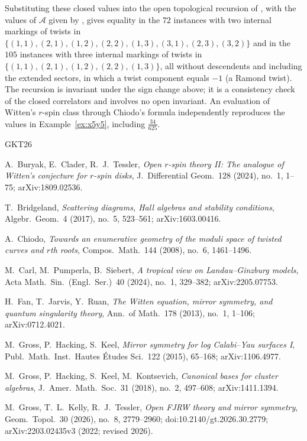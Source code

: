 \documentclass[11pt]{amsart}
\theoremstyle{definition}
\theoremstyle{remark}
\newcommand{\Ascr}{\mathcal{A}}
\begin{document}
Substituting these closed values into the open topological
recursion of \cite[Thm.~0.5]{GKT}, with the values of $\Ascr$ given by
\cite[Cor.~5.11]{GKT}, gives equality in the $72$ instances with two internal
markings of twists in $\{(1,1),(2,1),(1,2),(2,2),(1,3),(3,1),(2,3),(3,2)\}$
and in the $105$ instances with three internal markings of twists in
$\{(1,1),(2,1),(1,2),(2,2),(1,3)\}$, all without descendents and including the
extended sectors, in which a twist component equals $-1$ (a Ramond twist).  The recursion is invariant under
the sign change above; it is a consistency check of the closed correlators and
involves no open invariant.  An evaluation of Witten's $r$-spin class through
Chiodo's formula \cite{Chiodo08} independently reproduces the values in
Example~\ref{ex:x5y5}, including $\tfrac{34}{625}$.

\begin{thebibliography}{GKT26}

 A.~Buryak, E.~Clader, R.~J.~Tessler,
\emph{Open $r$-spin theory II: The analogue of Witten's conjecture for
$r$-spin disks}, J.\ Differential Geom.\ 128 (2024), no.~1, 1--75;
arXiv:1809.02536.

 T.~Bridgeland,
\emph{Scattering diagrams, Hall algebras and stability conditions},
Algebr.\ Geom.\ 4 (2017), no.~5, 523--561; arXiv:1603.00416.

 A.~Chiodo,
\emph{Towards an enumerative geometry of the moduli space of twisted curves
and $r$th roots}, Compos.\ Math.\ 144 (2008), no.~6, 1461--1496.

 M.~Carl, M.~Pumperla, B.~Siebert,
\emph{A tropical view on Landau--Ginzburg models},
Acta Math.\ Sin.\ (Engl.\ Ser.)\ 40 (2024), no.~1, 329--382;
arXiv:2205.07753.

 H.~Fan, T.~Jarvis, Y.~Ruan,
\emph{The Witten equation, mirror symmetry, and quantum singularity theory},
Ann.\ of Math.\ 178 (2013), no.~1, 1--106; arXiv:0712.4021.

 M.~Gross, P.~Hacking, S.~Keel,
\emph{Mirror symmetry for log Calabi--Yau surfaces I},
Publ.\ Math.\ Inst.\ Hautes \'Etudes Sci.\ 122 (2015), 65--168;
arXiv:1106.4977.

 M.~Gross, P.~Hacking, S.~Keel, M.~Kontsevich,
\emph{Canonical bases for cluster algebras}, J.\ Amer.\ Math.\ Soc.\ 31
(2018), no.~2, 497--608; arXiv:1411.1394.

 M.~Gross, T.~L.~Kelly, R.~J.~Tessler,
\emph{Open FJRW theory and mirror symmetry}, Geom.\ Topol.\ 30 (2026),
no.~8, 2779--2960; doi:10.2140/gt.2026.30.2779;
arXiv:2203.02435v3 (2022; revised 2026).


\end{thebibliography}
\end{document}
